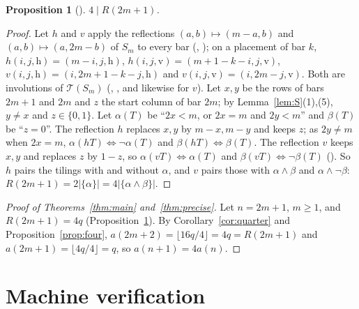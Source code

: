\documentclass[11pt]{amsart}
\theoremstyle{plain}
\newtheorem{proposition}[theorem]{Proposition}
\theoremstyle{definition}
\newcommand{\T}{\mathcal{T}}
\newcommand{\Sm}{S_m}
\begin{document}
\begin{proposition}[]\label{prop:dvd}
$4\mid R(2m+1)$.
\end{proposition}

\begin{proof}
Let $h$ and $v$ apply the reflections $(a,b)\mapsto(m-a,b)$ and $(a,b)\mapsto(a,2m-b)$ of $\Sm$ to every bar (, ); on a placement of bar $k$, $h(i,j,\mathrm h)=(m-i,j,\mathrm h)$, $h(i,j,\mathrm v)=(m+1-k-i,j,\mathrm v)$, $v(i,j,\mathrm h)=(i,2m+1-k-j,\mathrm h)$ and $v(i,j,\mathrm v)=(i,2m-j,\mathrm v)$. Both are involutions of $\T(\Sm)$ (, , and likewise for $v$). Let $x,y$ be the rows of bars $2m+1$ and $2m$ and $z$ the start column of bar $2m$; by Lemma~\ref{lem:S}(1),(5), $y\ne x$ and $z\in\{0,1\}$. Let $\alpha(T)$ be ``$2x<m$, or $2x=m$ and $2y<m$'' and $\beta(T)$ be ``$z=0$''. The reflection $h$ replaces $x,y$ by $m-x,m-y$ and keeps $z$; as $2y\ne m$ when $2x=m$, $\alpha(hT)\iff\neg\alpha(T)$ and $\beta(hT)\iff\beta(T)$. The reflection $v$ keeps $x,y$ and replaces $z$ by $1-z$, so $\alpha(vT)\iff\alpha(T)$ and $\beta(vT)\iff\neg\beta(T)$ (). So $h$ pairs the tilings with and without $\alpha$, and $v$ pairs those with $\alpha\wedge\beta$ and $\alpha\wedge\neg\beta$: $R(2m+1)=2|\{\alpha\}|=4|\{\alpha\wedge\beta\}|$.
\end{proof}

\begin{proof}[Proof of Theorems~\ref{thm:main} and~\ref{thm:precise}]
Let $n=2m+1$, $m\ge1$, and $R(2m+1)=4q$ (Proposition~\ref{prop:dvd}). By Corollary~\ref{cor:quarter} and Proposition~\ref{prop:four}, $a(2m+2)=\lfloor16q/4\rfloor=4q=R(2m+1)$ and $a(2m+1)=\lfloor4q/4\rfloor=q$, so $a(n+1)=4a(n)$.
\end{proof}

\section{Machine verification}\label{sec:lean}
\end{document}
